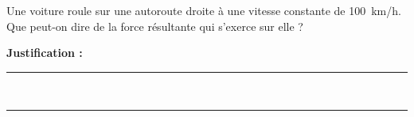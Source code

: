 Une voiture roule sur une autoroute droite à une vitesse constante de \qty{100}{km/h}. Que peut-on dire de la force résultante qui s'exerce sur elle ?

\choices

\noindent\textbf{Justification :} \hrulefill \\[2.5ex]
\rule{\linewidth}{0.4pt} \\[2.5ex]
\rule{\linewidth}{0.4pt}
\vfill
